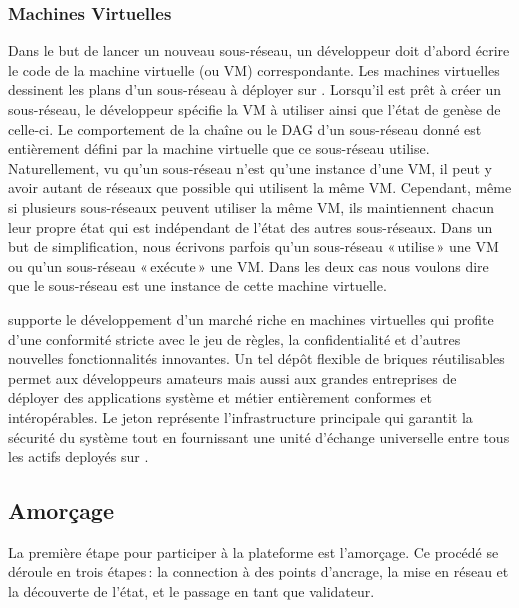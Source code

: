 \documentclass[runningheads,francais,a4paper]{llncs}
\begin{document}
\subsubsection{Machines Virtuelles}
Dans le but de lancer un nouveau sous-réseau, un développeur doit d'abord écrire le code de la machine virtuelle (ou VM)
correspondante. Les machines virtuelles dessinent les plans d'un sous-réseau à déployer sur \AVAPlatformName{}.
Lorsqu'il est prêt à créer un sous-réseau, le développeur spécifie la VM à utiliser ainsi que l'état de genèse de
celle-ci. Le comportement de la chaîne ou le DAG d'un sous-réseau donné est entièrement défini par la machine virtuelle
que ce sous-réseau utilise. Naturellement, vu qu'un sous-réseau n'est qu'une instance d'une VM, il peut y avoir autant de
réseaux que possible qui utilisent la même VM. Cependant, même si plusieurs sous-réseaux peuvent utiliser la même VM,
ils maintiennent chacun leur propre état qui est indépendant de l'état des autres sous-réseaux. Dans un but de
simplification, nous écrivons parfois qu'un sous-réseau «\,utilise\,» une VM ou qu'un sous-réseau «\,exécute\,» une VM.
Dans les deux cas nous voulons dire que le sous-réseau est une instance de cette machine virtuelle.

\AVAPlatformName{} supporte le développement d'un marché riche en machines virtuelles qui profite d'une conformité
stricte avec le jeu de règles, la confidentialité et d'autres nouvelles fonctionnalités innovantes. Un tel dépôt
flexible de briques réutilisables permet aux développeurs amateurs mais aussi aux grandes entreprises de déployer des
applications système et métier entièrement conformes et intéropérables. Le jeton \AVATokenName{} représente
l'infrastructure principale qui garantit la sécurité du système tout en fournissant une unité d'échange universelle
entre tous les actifs deployés sur \AVAPlatformName{}.

\subsection{Amorçage}
La première étape pour participer à la plateforme \AVAPlatformName{} est l'amorçage. Ce procédé se déroule en trois
étapes\,: la connection à des points d'ancrage, la mise en réseau et la découverte de l'état, et le passage en tant
que validateur.
\end{document}
